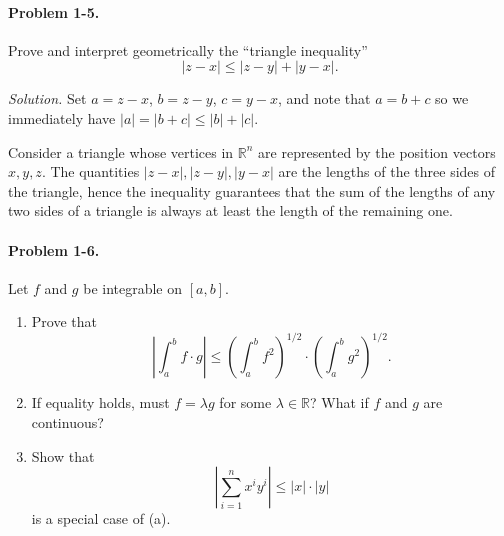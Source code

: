 \documentclass[11pt]{report}
\newcommand{\R}{\mathbb{R}}
\newcommand{\problem}[1]{\paragraph{Problem #1.}}
\newcommand{\solution}{\noindent\textit{Solution.} }
\begin{document}
    \problem{1-5} Prove and interpret geometrically the ``triangle inequality'' \[
        |z - x| \leq |z - y| + |y - x|.
    \] 

    \solution Set $a = z - x$, $b = z - y$, $c = y - x$, and note that $a = b + c$ so
    we immediately have $|a| = |b + c| \leq |b| + |c|$.

    Consider a triangle whose vertices in $\R^n$ are represented by the position
    vectors $x, y, z$. The quantities $|z - x|, |z - y|, |y - x|$ are the lengths of
    the three sides of the triangle, hence the inequality guarantees that the sum of
    the lengths of any two sides of a triangle is always at least the length of the
    remaining one.


    \problem{1-6} Let $f$ and $g$ be integrable on $[a, b]$. 
    \begin{enumerate}
        \item Prove that \[
            \left|\int_a^b f\cdot g\right| \leq \left(\int_a^b f^2\right)^{1 / 2}
            \cdot \left(\int_a^b g^2\right)^{1 / 2}.
        \] 

        \item If equality holds, must $f = \lambda g$ for some $\lambda \in \R$? What
        if $f$ and $g$ are continuous?

        \item Show that \[
            |\sum_{i = 1}^n x^i y^i| \leq |x| \cdot |y|
        \] is a special case of (a).
    \end{enumerate}
\end{document}
